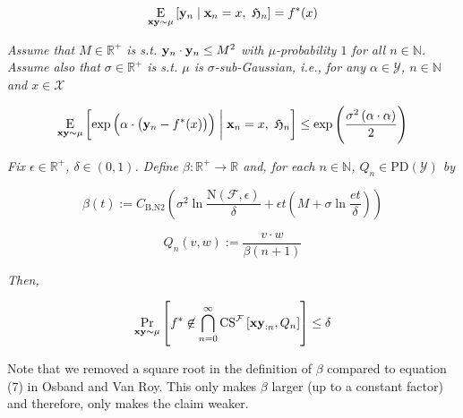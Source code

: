 \documentclass[a4paper]{article}
\newcommand{\Co}[1]{}
\newcommand{\AP}[1]{\left(#1\right)}
\newcommand{\AB}[1]{\left[#1\right]}
\newcommand{\ABM}[2]{\left[#1\;\middle\vert\;#2\right]}
\newcommand{\Pa}[2]{\underset{#1}{\operatorname{Pr}}\AB{#2}}
\newcommand{\CE}[3]{\underset{#1}{\operatorname{E}}\ABM{#2}{#3}}
\newcommand{\Nats}{\mathbb{N}}
\newcommand{\Reals}{\mathbb{R}}
\newcommand{\PD}{\mathrm{PD}}
\newcommand{\X}{\mathcal{X}}
\newcommand{\Y}{\mathcal{Y}}
\newcommand{\F}{\mathcal{F}}
\newcommand{\N}{\mathrm{N}}
\newcommand{\CS}{\mathrm{CS}}
\begin{document}
$$\CE{\bold{xy}\sim\mu}{\bold{y}_n}{\bold{x}_n=x,\ \mathfrak{H}_n} = f^*(x)$$

\textit{Assume that $M\in\Reals^+$ is s.t. $\bold{y}_n\cdot\bold{y}_n\leq M^2$ with $\mu$-probability $1$ for all $n\in\Nats$. Assume also that $\sigma\in\Reals^+$ is s.t. $\mu$ is $\sigma$-sub-Gaussian, i.e., for any $\alpha\in\Y$, $n\in\Nats$ and $x\in\X$}\Co{i}

$$\CE{\bold{xy}\sim\mu}{\exp\AP{\alpha\cdot\AP{\bold{y}_n-f^*(x)}}}{\bold{x}_n=x,\ \mathfrak{H}_n} \leq \exp\AP{\frac{\sigma^2\AP{\alpha\cdot\alpha}}{2}}$$

\textit{Fix $\epsilon\in\Reals^+$, $\delta\in(0,1)$. Define $\beta:\Reals^+\rightarrow\Reals$ and, for each $n\in\Nats$, $Q_n\in\PD(\Y)$ by}\Co{i}

$$\beta(t):=C_{\mathrm{B.N2}}\AP{\sigma^2 \ln{\frac{\N(\F,\epsilon)}{\delta}}+\epsilon t\AP{M+\sigma\ln{\frac{et}{\delta}}}}$$

$$Q_n(v,w):=\frac{v\cdot w}{\beta(n+1)}$$

\textit{Then,}\Co{i}

$$\Pa{\bold{xy}\sim\mu}{f^*\not\in\bigcap_{n=0}^\infty\CS^\F\AB{\bold{xy}_{:n},Q_n}} \leq \delta$$

Note that we removed a square root in the definition of $\beta$ compared to equation (7) in Osband and Van Roy. This only makes $\beta$ larger (up to a constant factor) and therefore, only makes the claim weaker.
\end{document}
